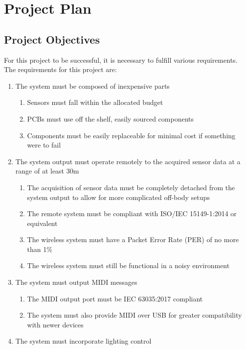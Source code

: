 \section{Project Plan}
\subsection{Project Objectives}
For this project to be successful, it is necessary to fulfill various requirements.
The requirements for this project are:

\begin{enumerate}
    \item The system must be composed of inexpensive parts
    \begin{enumerate}
        \item Sensors must fall within the allocated budget
        \item PCBs must use off the shelf, easily sourced components
        \item Components must be easily replaceable for minimal cost if something were to fail
    \end{enumerate}
    \item The system output must operate remotely to the acquired sensor data at a range of at least 30m
    \begin{enumerate}
        \item The acquisition of sensor data must be completely detached from the system output
        to allow for more complicated off-body setups
        \item The remote system must be compliant with ISO/IEC 15149-1:2014 or equivalent
        \item The wireless system must have a Packet Error Rate (PER) of no more than 1\%
        \item The wireless system must still be functional in a noisy environment
    \end{enumerate}
    \item The system must output MIDI messages
    \begin{enumerate}
        \item The MIDI output port must be IEC 63035:2017 compliant
        \item The system must also provide MIDI over USB for greater compatibility with newer devices
    \end{enumerate}
    \item The system must incorporate lighting control
\end{enumerate}

